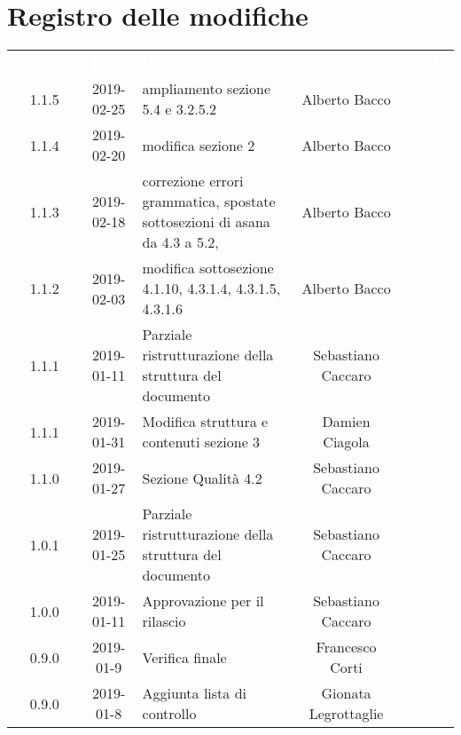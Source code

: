 
\section*{Registro delle modifiche}
{
	\renewcommand{\arraystretch}{1.5}
	\centering
	\begin{longtable}{ c c C{4cm}  c  c }
		
		\textcolor{white}{\textbf{Versione}} & \textcolor{white}{\textbf{Data}} & \textcolor{white}{\textbf{Descrizione}} & \textcolor{white}{\textbf{Nominativo}} & \textcolor{white}{\textbf{Ruolo}}\\
		1.1.5 & 2019-02-25 & ampliamento sezione 5.4 e 3.2.5.2 & Alberto Bacco & \reda{} \\
		
		1.1.4 & 2019-02-20 & modifica sezione 2 & Alberto Bacco & \reda{} \\
		
		1.1.3 & 2019-02-18 & correzione errori grammatica, spostate sottosezioni di asana da 4.3 a 5.2, & Alberto Bacco & \reda{} \\
		
		1.1.2 & 2019-02-03 & modifica sottosezione 4.1.10, 4.3.1.4, 4.3.1.5, 4.3.1.6 & Alberto Bacco& \reda{} \\
		
		1.1.1 & 2019-01-11 & Parziale ristrutturazione della struttura del documento & Sebastiano Caccaro & \reda{} \\		
		
		1.1.1 & 2019-01-31 & Modifica struttura e contenuti sezione 3  & Damien Ciagola & \reda{} \\	
		
		1.1.0 & 2019-01-27 & Sezione Qualità 4.2 & Sebastiano Caccaro & \reda{} \\	
		
		1.0.1 & 2019-01-25 & Parziale ristrutturazione della struttura del documento & Sebastiano Caccaro & \reda{} \\		
		
		1.0.0 & 2019-01-11 & Approvazione per il rilascio & Sebastiano Caccaro & \Res{} \\
		
		0.9.0 & 2019-01-9 & Verifica finale & Francesco Corti & \ver{} \\
		
		0.9.0 & 2019-01-8 & Aggiunta lista di controllo & Gionata Legrottaglie & \reda{} \\
		

\end{longtable}}

